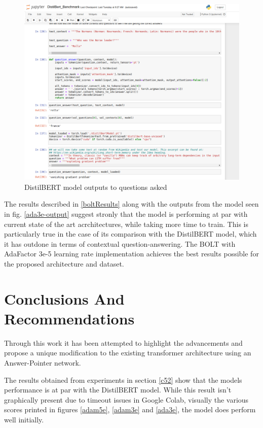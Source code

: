 \documentclass[a4paper,12pt]{report}
\begin{document}
		\begin{figure}[!h]
			\centering
			\includegraphics[scale=0.35]{../images/distilbert-answers.png}
			\caption{DistilBERT model outputs to questions asked}\label{distilOut}
		\end{figure}

	The results described in \ref{boltResults} along with the outputs from the model seen in fig. \ref{ada3e-output} suggest stronly that the model is performing at par with current state of the art acrchitectures, while taking more time to train. This is particularly true in the case of its comparison with the DistilBERT model, which it has outdone in terms of contextual question-answering. The BOLT with AdaFactor 3e-5 learning rate implementation achieves the best results possible for the proposed architecture and dataset.

    \chapter{Conclusions And Recommendations}\label{c6}

    Through this work it has been attempted to highlight the advancements and propose a unique modification to the existing transformer architecture using an Answer-Pointer network.

    The results obtained from experiments in section \ref{c52} show that the models performance is at par with the DistilBERT model. While this result isn't graphically present due to timeout issues in Google Colab, visually the various scores printed in figures \ref{adam5e}, \ref{adam3e} and \ref{ada3e}, the model does perform well initially.
\end{document}
